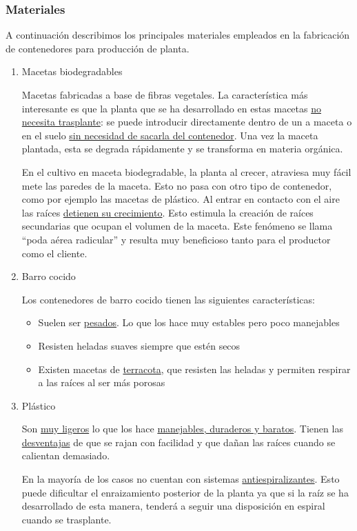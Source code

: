 \documentclass[a4paper,12pt,oneside]{article}
\begin{document}
\subsubsection{Materiales}
\label{sec:org60e467b}
A continuación describimos los principales materiales empleados en la
fabricación de contenedores para producción de planta.\\
\begin{enumerate}
\item Macetas biodegradables
\label{sec:org1ad393e}

Macetas fabricadas a base de fibras vegetales. La característica más
interesante es que la planta que se ha desarrollado en estas macetas \uline{no
necesita trasplante}: se puede introducir directamente dentro de un a maceta o
en el suelo \uline{sin necesidad de sacarla del contenedor}. Una vez la maceta
plantada, esta se degrada rápidamente y se transforma en materia orgánica.

En el cultivo en maceta biodegradable, la planta al crecer, atraviesa muy
fácil mete las paredes de la maceta. Esto no pasa con otro tipo de contenedor,
como por ejemplo las macetas de plástico. Al entrar en contacto con el aire las
raíces \uline{detienen su crecimiento}. Esto estimula la creación de raíces
secundarias que ocupan el volumen de la maceta. Este fenómeno se llama ``poda
aérea radicular'' y resulta muy beneficioso tanto para el productor como el
cliente.
\item Barro cocido
\label{sec:orgf15ab5b}

Los contenedores de barro cocido tienen las siguientes características:
\begin{itemize}
\item Suelen ser \uline{pesados}. Lo que los hace muy estables pero poco manejables
\item Resisten heladas suaves siempre que estén secos
\item Existen macetas de \uline{terracota}, que resisten las heladas y permiten respirar a
las raíces al ser más porosas
\end{itemize}
\item Plástico
\label{sec:org0c0021f}

Son \uline{muy ligeros} lo que los hace \uline{manejables, duraderos y baratos}. Tienen las
\uline{desventajas} de que se rajan con facilidad y que dañan las raíces cuando se
calientan demasiado. 

En la mayoría de los casos no cuentan con sistemas \uline{antiespiralizantes}. Esto
puede dificultar el enraizamiento posterior de la planta ya que si la raíz se ha
desarrollado de esta manera, tenderá a seguir una disposición en espiral cuando
se trasplante.


\end{enumerate}
\end{document}
